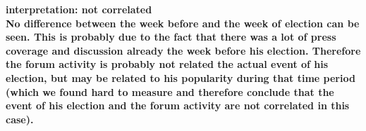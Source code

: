 \documentclass[11pt,a4paper,english]{article}
\begin{document}
\begin{itemize}
\begin{figure}[H]
\begin{center}
							\end{center}
							\vspace{-5pt}
						\end{figure}	
						\bf interpretation: \rm not correlated
						\\ No difference between the week before and the week of election can be seen. This is probably due to the fact that there was a lot of press coverage and discussion already the week before his election. Therefore the forum activity is probably not related the actual event of his election, but may be related to his popularity during that time period (which we found hard to measure and therefore conclude that the event of his election and the forum activity are not correlated in this case).
						
						
						

\end{itemize}
\end{document}
